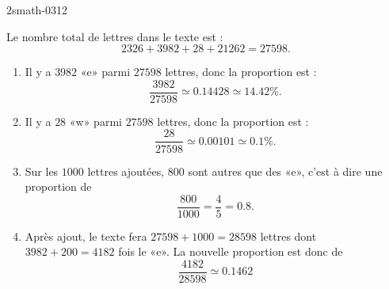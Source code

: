
\begin{corrige}{2smath-0312}

    Le nombre total de lettres dans le texte est :
    \begin{equation}
        2326+3982+28+21262=27598.
    \end{equation}
    \begin{enumerate}
        \item
            Il y a \( 3982\) «e» parmi \( 27598\) lettres, donc la proportion est :
            \begin{equation}
                \frac{ 3982 }{ 27598 }\simeq 0.14428\simeq 14.42\%.
            \end{equation}
        \item
            Il y a \( 28\) «w» parmi \( 27598\) lettres, donc la proportion est :
            \begin{equation}
                \frac{ 28 }{ 27598 }\simeq 0.00101\simeq 0.1\%.
            \end{equation}
        \item
            Sur les \( 1000\) lettres ajoutées, \( 800\) sont autres que des «e», c'est à dire une proportion de
            \begin{equation}
                \frac{ 800 }{ 1000 }=\frac{ 4 }{ 5 }=0.8.
            \end{equation}
        \item
            Après ajout, le texte fera \( 27598+1000=28598\) lettres dont \( 3982+200=4182\) fois le «e». La nouvelle proportion est donc de
            \begin{equation}
                \frac{ 4182 }{ 28598 }\simeq 0.1462
            \end{equation}
    \end{enumerate}

\end{corrige}
